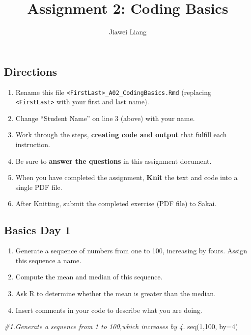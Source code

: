 \documentclass[
]{article}
\title{Assignment 2: Coding Basics}
\author{Jiawei Liang}
\date{}
\newenvironment{Shaded}{\begin{snugshade}}{\end{snugshade}}
\newcommand{\AttributeTok}[1]{\textcolor[rgb]{0.77,0.63,0.00}{#1}}
\newcommand{\CommentTok}[1]{\textcolor[rgb]{0.56,0.35,0.01}{\textit{#1}}}
\newcommand{\DecValTok}[1]{\textcolor[rgb]{0.00,0.00,0.81}{#1}}
\newcommand{\FunctionTok}[1]{\textcolor[rgb]{0.00,0.00,0.00}{#1}}
\newcommand{\NormalTok}[1]{#1}
\providecommand{\tightlist}{%
  \setlength{\itemsep}{0pt}\setlength{\parskip}{0pt}}
\begin{document}
\maketitle

\hypertarget{directions}{%
\subsection{Directions}\label{directions}}

\begin{enumerate}
\def\labelenumi{\arabic{enumi}.}
\tightlist
\item
  Rename this file
  \texttt{\textless{}FirstLast\textgreater{}\_A02\_CodingBasics.Rmd}
  (replacing \texttt{\textless{}FirstLast\textgreater{}} with your first
  and last name).
\item
  Change ``Student Name'' on line 3 (above) with your name.
\item
  Work through the steps, \textbf{creating code and output} that fulfill
  each instruction.
\item
  Be sure to \textbf{answer the questions} in this assignment document.
\item
  When you have completed the assignment, \textbf{Knit} the text and
  code into a single PDF file.
\item
  After Knitting, submit the completed exercise (PDF file) to Sakai.
\end{enumerate}

\hypertarget{basics-day-1}{%
\subsection{Basics Day 1}\label{basics-day-1}}

\begin{enumerate}
\def\labelenumi{\arabic{enumi}.}
\item
  Generate a sequence of numbers from one to 100, increasing by fours.
  Assign this sequence a name.
\item
  Compute the mean and median of this sequence.
\item
  Ask R to determine whether the mean is greater than the median.
\item
  Insert comments in your code to describe what you are doing.
\end{enumerate}

\begin{Shaded}
\begin{Highlighting}[]
\CommentTok{\#1.Generate a sequence from 1 to 100,which increases by 4.}
\FunctionTok{seq}\NormalTok{(}\DecValTok{1}\NormalTok{,}\DecValTok{100}\NormalTok{, }\AttributeTok{by=}\DecValTok{4}\NormalTok{) }
\end{Highlighting}
\end{Shaded}
\end{document}
